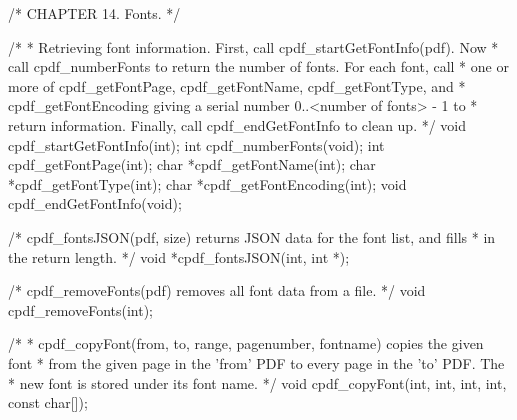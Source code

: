 /* CHAPTER 14. Fonts. */

/*
 * Retrieving font information. First, call cpdf_startGetFontInfo(pdf). Now
 * call cpdf_numberFonts to return the number of fonts. For each font, call
 * one or more of cpdf_getFontPage, cpdf_getFontName, cpdf_getFontType, and
 * cpdf_getFontEncoding giving a serial number 0..<number of fonts> - 1 to
 * return information. Finally, call cpdf_endGetFontInfo to clean up.
 */
void cpdf_startGetFontInfo(int);
int cpdf_numberFonts(void);
int cpdf_getFontPage(int);
char *cpdf_getFontName(int);
char *cpdf_getFontType(int);
char *cpdf_getFontEncoding(int);
void cpdf_endGetFontInfo(void);

/* cpdf_fontsJSON(pdf, size) returns JSON data for the font list, and fills
 * in the return length. */
void *cpdf_fontsJSON(int, int *);

/* cpdf_removeFonts(pdf) removes all font data from a file. */
void cpdf_removeFonts(int);

/*
 * cpdf_copyFont(from, to, range, pagenumber, fontname) copies the given font
 * from the given page in the 'from' PDF to every page in the 'to' PDF. The
 * new font is stored under its font name.
 */
void cpdf_copyFont(int, int, int, int, const char[]);


